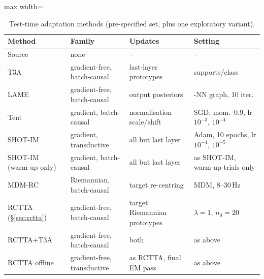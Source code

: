 \documentclass[preprint,12pt]{elsarticle}
\newcommand{\rev}[1]{#1}
\begin{document}
\begin{table}[!htbp]
\centering
\caption{Test-time adaptation methods (pre-specified set\rev{, plus one exploratory variant}).}
\label{tab:tta}
\setlength{\tabcolsep}{3pt}
\begin{adjustbox}{max width=\textwidth}
\begin{tabular}{@{}>{\raggedright\arraybackslash}p{2.8cm}>{\raggedright\arraybackslash}p{3.6cm}>{\raggedright\arraybackslash}p{4.2cm}>{\raggedright\arraybackslash}p{4.4cm}@{}}
\toprule
Method & Family & Updates & Setting \\
\midrule
Source & none & -- & -- \\
T3A~\cite{iwasawa2021t3a} & gradient-free, \rev{batch-causal} & last-layer prototypes & 20 supports/class \\
LAME~\cite{boudiaf2022lame} & gradient-free, \rev{batch-causal} & output posteriors & 5-NN graph, 10 iter. \\
Tent~\cite{wang2021tent} & gradient, \rev{batch-causal} & normalisation scale/shift & SGD, mom.\ 0.9, lr $10^{-3}$, $10^{-4}$ \\
SHOT-IM~\cite{liang2020shot} & gradient, \rev{transductive} & all but last layer & Adam, 10 epochs, lr $10^{-4}$, $10^{-5}$ \\
\rev{SHOT-IM (warm-up only)} & \rev{gradient, batch-causal} & \rev{all but last layer} & \rev{as SHOT-IM, warm-up trials only} \\
MDM-RC & Riemannian, \rev{batch-causal} & target re-centring & MDM, 8--30\,Hz \\
RCTTA (\S\ref{sec:rctta}) & gradient-free, \rev{batch-causal} & target Riemannian prototypes & $\lambda=1$, $n_0=20$ \\
RCTTA+T3A & gradient-free, \rev{batch-causal} & both & as above \\
\rev{RCTTA offline} & \rev{gradient-free, transductive} & \rev{as RCTTA, final EM pass} & \rev{as above} \\
\bottomrule
\end{tabular}
\end{adjustbox}
\end{table}
\end{document}
